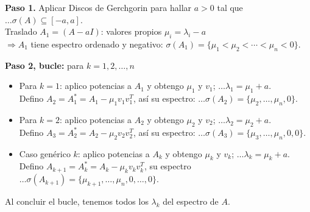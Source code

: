 \documentclass[12pt]{article}
\begin{document}
\begin{ejercicio}[3 puntos]
\begin{enumerate}[label=\alph*)]
				\textbf{Paso 1.} Aplicar Discos de Gerchgorin para hallar $a > 0$ tal que $\ldots \sigma(A) \subseteq [-a, a]$. \\
				Traslado $A_1 = (A - aI)$: valores propios $\mu_i = \lambda_i - a$ \\
				$\Rightarrow A_1$ tiene espectro ordenado y negativo: $\sigma(A_1) = \{\mu_1 < \mu_2 < \cdots < \mu_n < 0\}$.
				
				\textbf{Paso 2, bucle:} para $k=1,2,\dots,n$
				
				\begin{itemize}
					\item Para $k=1$: aplico potencias a $A_1$ y obtengo $\mu_1$ y $v_1$; $\ldots \lambda_1 = \mu_1 + a$. \\
					Defino $A_2 = A_1^* = A_1 - \mu_1 v_1 v_1^T$, así su espectro: $\ldots \sigma(A_2) = \{\mu_2, \ldots, \mu_n, 0\}$.
					
					\item Para $k=2$: aplico potencias a $A_2$ y obtengo $\mu_2$ y $v_2$; $\ldots\lambda_2 = \mu_2 + a$. \\
					Defino $A_3 = A_2^* = A_2 - \mu_2 v_2 v_2^T$, así su espectro: $\ldots \sigma(A_3) = \{\mu_3, \ldots, \mu_n, 0, 0\}$.
					
					\item Caso genérico $k$: aplico potencias a $A_k$ y obtengo $\mu_k$ y $v_k$; $\ldots\lambda_k = \mu_k + a$. \\
					Defino $A_{k+1} = A_k^* = A_k - \mu_k v_k v_k^T$, su espectro $\ldots\sigma(A_{k+1}) = \{\mu_{k+1}, \ldots, \mu_n, 0, \ldots, 0\}$.
				\end{itemize}
				
				Al concluir el bucle, tenemos todos los $\lambda_k$ del espectro de $A$.
		\end{enumerate}
	\end{ejercicio}	
	
\end{document}
